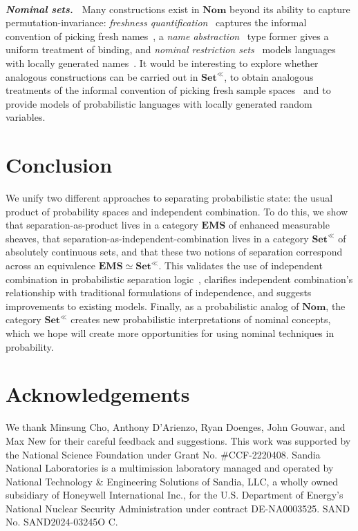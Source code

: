 \documentclass[
  sigconf,
  screen, ]{acmart}
\theoremstyle{definition}
\newcommand\goodparagraph[1]{\hspace{0em}\\[-0.5em]\textbf{\textit{#1.~}}}
\newcommand\fremlinf[3]{\cite[\href{https://www1.essex.ac.uk/maths/people/fremlin/chap#2.pdf\#page=#3}{#1}]{fremlin2000measure}}
\newcommand\nref[2]{\hyperref[#1]{#2}} \newcommand\checkhigh{{\huge{\color{red}\textbf{TODO: check}}}}
\newcommand\texagoodname{absolutely continuous set}
\newcommand\agoodname{\texagoodname}
\newcommand\agoodnamecat{\mathbf{Set}^\ll}
\newcommand\sheafcatadj{enhanced measurable}
\newcommand\texgoodsheaves{\sheafcatadj{} sheaves}
\newcommand\goodsheaves{\texgoodsheaves}
\newcommand\goodsheafcat{\mathbf{EMS}}
\newcommand\Nom{{\nref{def:Nom}{\mathbf{Nom}}}}
\newcommand\sheafcat{{\nref{def:sheafcat}{\goodsheafcat}}}
\newcommand\cgsets{{\nref{def:cgsets}{\agoodnamecat}}}
\begin{document}
\goodparagraph{Nominal sets}
Many constructions exist in
$\Nom$ beyond its ability to capture permutation-invariance:
\emph{freshness quantification}~\cite{menni2003quantifiers}
captures the informal convention of picking fresh names~\cite{barendregt1984lambda},
a \emph{name abstraction}~\cite[\S4]{pitts2013nominal} type former
gives a uniform treatment of binding,
and \emph{nominal restriction sets}~\cite[\S9.1]{pitts2013nominal}
models languages with locally generated names~\cite{odersky1994functional,pitts1993observable}.
It would be interesting to explore whether analogous constructions
can be carried out in $\cgsets$, to obtain analogous treatments
of the informal convention of picking fresh sample spaces~\fremlinf{\S27}{27}{1}
and to provide models of probabilistic languages with locally generated random variables.

\section{Conclusion}
We unify two different approaches to separating probabilistic state: the usual
product of probability spaces and independent combination.
To do this, we show that separation-as-product lives in a category
$\sheafcat$ of \goodsheaves{},
that separation-as-independent-combination lives in a category
$\cgsets$ of \agoodname{s},
and that these two notions of separation correspond
across an equivalence $\sheafcat\simeq\cgsets$.
This validates the use of independent combination
in probabilistic separation logic~\citep{li2023lilac},
clarifies independent combination's relationship with traditional formulations
of independence, and suggests improvements to existing models.
Finally, as a probabilistic analog of $\Nom$,
the category $\cgsets$ creates new probabilistic interpretations
of nominal concepts, which we hope will
create more opportunities for using nominal techniques in probability.

\section{Acknowledgements}

We thank Minsung Cho, 
Anthony D'Arienzo,
Ryan Doenges, 
John Gouwar,
and Max New
for their careful feedback
and suggestions.
This work was supported by the National Science Foundation under Grant No. \#CCF-2220408.
Sandia National Laboratories is a multimission laboratory
managed and operated by National Technology \& Engineering
Solutions of Sandia, LLC, a wholly owned subsidiary
of Honeywell International Inc., for the U.S. Department of
Energy's National Nuclear Security Administration under
contract DE-NA0003525. SAND No. SAND2024-03245O C.
\end{document}
